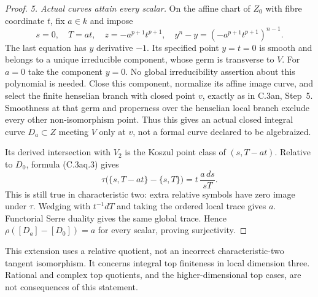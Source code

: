 \begin{proof}
\emph{5. Actual curves attain every scalar.}
On the affine chart of $Z_0$ with fibre coordinate $t$,
fix $a\in k$ and impose
\[
 s=0,\quad T=at,\quad z=-a^{p+1}t^{p+1},\quad
                    y^n-y=(-a^{p+1}t^{p+1})^{n-1}.
                                                        \tag{C.3aq.13}
\]
The last equation has $y$ derivative $-1$. Its specified
point $y=t=0$ is smooth and belongs to a unique
irreducible component, whose germ is transverse to $V$.
For $a=0$ take the component $y=0$. No global
irreducibility assertion about this polynomial is needed.
Close this component, normalize its affine image curve,
and select the finite henselian branch with closed point
$v$, exactly as in C.3an, Step~5. Smoothness at that
germ and properness over the henselian local branch
exclude every other non-isomorphism point. Thus this
gives an actual closed integral curve $D_a\subset Z$
meeting $V$ only at $v$, not a formal curve declared
to be algebraized.

Its derived intersection with $V_2$ is the Koszul
point class of $(s,T-at)$. Relative to $D_0$, formula
(C.3aq.3) gives
\[
 \tau\bigl(\{s,T-at\}-\{s,T\}\bigr)
                           =t\,\frac{a\,ds}{sT}.
\]
This is still true in characteristic two: extra
relative symbols have zero image under $\tau$.
Wedging with $t^{-1}dT$ and taking the ordered
local trace gives $a$. Functorial Serre duality gives
the same global trace. Hence
$\rho([D_a]-[D_0])=a$ for every scalar, proving
surjectivity.
\end{proof}

This extension uses a relative quotient, not an
incorrect characteristic-two tangent isomorphism.
It concerns integral top finiteness in local dimension
three. Rational and complex top quotients, and the
higher-dimensional top cases, are not consequences
of this statement.
